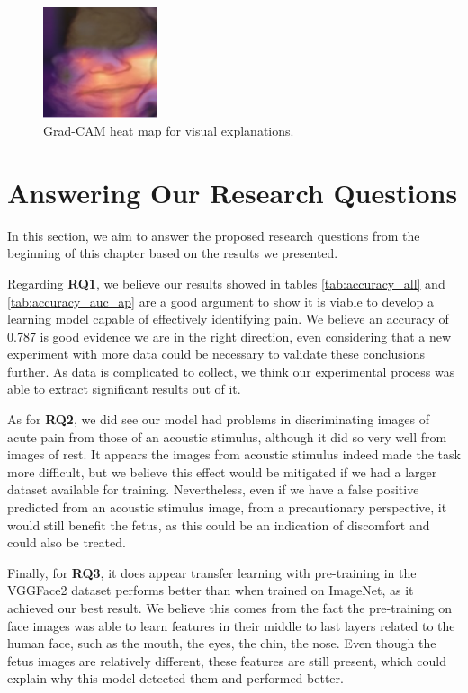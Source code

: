 \begin{figure}[h!tp]
    \centering
    \includegraphics[width=0.3\textwidth]{imgs/chap6_gradcam.png}
    \caption{Grad-CAM heat map for visual explanations.}
    \label{fig:gradcam}
\end{figure}

\section{Answering Our Research Questions}

In this section, we aim to answer the proposed research questions from the beginning of this chapter based on the results we presented.

Regarding \textbf{RQ1}, we believe our results showed in tables \ref{tab:accuracy_all} and \ref{tab:accuracy_auc_ap} are a good argument to show it is viable to develop a learning model capable of effectively identifying pain. We believe an accuracy of 0.787 is good evidence we are in the right direction, even considering that a new experiment with more data could be necessary to validate these conclusions further. As data is complicated to collect, we think our experimental process was able to extract significant results out of it.

As for \textbf{RQ2}, we did see our model had problems in discriminating images of acute pain from those of an acoustic stimulus, although it did so very well from images of rest. It appears the images from acoustic stimulus indeed made the task more difficult, but we believe this effect would be mitigated if we had a larger dataset available for training. Nevertheless, even if we have a false positive predicted from an acoustic stimulus image, from a precautionary perspective, it would still benefit the fetus, as this could be an indication of discomfort and could also be treated.

Finally, for \textbf{RQ3}, it does appear transfer learning with pre-training in the VGGFace2 dataset performs better than when trained on ImageNet, as it achieved our best result. We believe this comes from the fact the pre-training on face images was able to learn features in their middle to last layers related to the human face, such as the mouth, the eyes, the chin, the nose. Even though the fetus images are relatively different, these features are still present, which could explain why this model detected them and performed better. 

